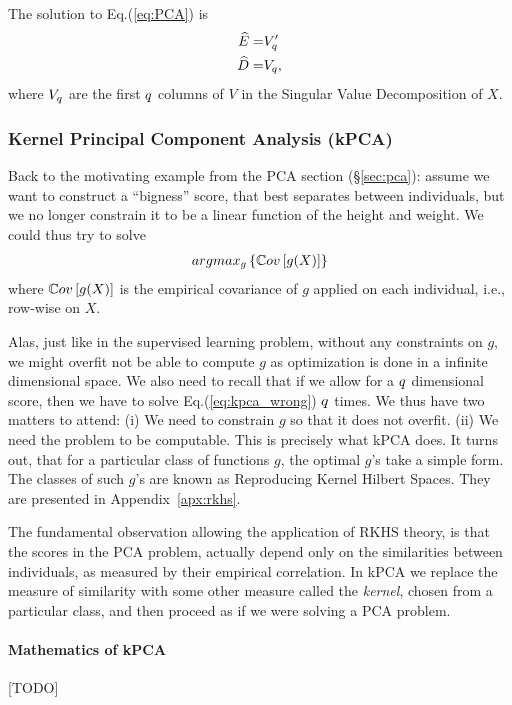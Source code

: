 The solution to Eq.(\ref{eq:PCA}) is 
\begin{align}
\label{eq:PCA_solution}
	\widehat{E} =& V_q' \\
	\widehat{D} =& V_q,
\end{align}
where $V_q$ are the first $q$ columns of $V$ in the Singular Value Decomposition of $X$.





\subsubsection{Kernel Principal Component Analysis (kPCA)}
\label{sec:kpca}

Back to the motivating example from the PCA section (\S\ref{sec:pca}): assume we want to construct a ``bigness'' score, that best separates between individuals, but we no longer constrain it to be a linear function of the height and weight.
We could thus try to solve 
\begin{align}
\label{eq:kpca_wrong}
	argmax_{g}\left\{ \mathbb{C}ov \left[ g(X) \right] \right\}
\end{align}
where $\mathbb{C}ov \left[ g(X) \right]$ is the empirical covariance of $g$ applied on each individual, i.e., row-wise on $X$.

Alas, just like in the supervised learning problem, without any constraints on $g$, we might overfit \andor not be able to compute $g$ as optimization is done in a infinite dimensional space. 
We also need to recall that if we allow for a $q$ dimensional score, then we have to solve Eq.(\ref{eq:kpca_wrong}) $q$ times.
We thus have two matters to attend:
(i) We need to constrain $g$ so that it does not overfit.
(ii) We need the problem to be computable.
This is precisely what kPCA does. 
It turns out, that for a particular class of functions $g$, the optimal $g$'s take a simple form. 
The classes of such $g$'s are known as Reproducing Kernel Hilbert Spaces. They are presented in Appendix~\ref{apx:rkhs}.

The fundamental observation allowing the application of RKHS theory, is that the scores in the PCA problem, actually depend only on the similarities between individuals, as measured by their empirical correlation. 
In kPCA we replace the measure of similarity with some other measure called the \emph{kernel}, chosen from a particular class, and then proceed as if we were solving a PCA problem.


\paragraph{Mathematics of kPCA}
[TODO]


